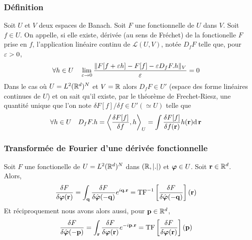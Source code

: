 \documentclass[10.5pt]{article}
\begin{document}
\begin{multicols}{2}
\subsubsection{Définition}
Soit $U$ et $V$ deux espaces de Banach. Soit $F$ une fonctionnelle de $U$ dans $V$. 
Soit $f \in U$. On appelle, si elle existe, dérivée (au sens de Fréchet) de la fonctionelle $F$ prise en $f$, l'application linéaire continu de $\mathcal{L}(U,V)$, notée $D_fF$ telle que, pour $\varepsilon>0$, 
\begin{equation}
\forall h \in U \quad \lim_{ \varepsilon \rightarrow 0 } \frac{\| F[f+\varepsilon h] - F[f] - \varepsilon D_fF.h\|_V}{\varepsilon}  = 0
\end{equation} 
Dans le cas où $U = L^2(\mathbb{R}^d)^N$ et $V = \mathbb{R}$ alors $D_fF \in U'$ (espace des forme linéaires continues de $U$) et on sait qu'il existe, par le théorème de Frechet-Riesz, une quantité unique que l'on note $\delta F[f]/\delta f \in U'(\simeq U)$ telle que 
\begin{equation}
\forall h \in U \quad D_f F.h = {\left< \frac{\delta F[f]}{\delta f}, h \right>}_{U} = \int \frac{\delta F[f]}{\delta f({\bf r})} h({\bf r}) \text{d} \, {\bf r}	
\end{equation}

\vspace*{11pt}

\subsubsection{Transformée de Fourier d'une dérivée fonctionnelle}

Soit $F$ une fonctionelle de $U = L^2(\mathbb{R}^d)^N$ dans $(\mathbb{R},|.|)$ et $\boldsymbol{ \varphi} \in U$.
Soit ${\bf r} \in \mathbb{R}^d$.
Alors, 
\begin{equation}
  \frac{\delta F}{\delta \boldsymbol{ \varphi}({\bf r})} = \int_{{\bf q}} \frac{\delta F}{\delta \hat{\boldsymbol{ \varphi}}(-{\bf q})} e^{i{\bf q}.{\bf r}} = \text{TF}^{-1} \left[ \frac{\delta F}{\delta \hat{\boldsymbol{ \varphi}}(-{\bf q})} \right]({\bf r}) 
\end{equation} 
Et réciproquement nous avons alors aussi, pour ${\bf p} \in \mathbb{R}^d$,  
\begin{equation}
  \frac{\delta F}{\delta \hat{\boldsymbol{ \varphi}}(-{\bf p})} = \int_{{\bf r}} \frac{\delta F}{\delta \boldsymbol{ \varphi}({\bf r})} e^{-i{\bf p}.{\bf r}} = \text{TF} \left[ \frac{\delta F}{\delta \boldsymbol{ \varphi}({\bf r})} \right]({\bf p}) 
\end{equation} 


\end{multicols}
\end{document}
